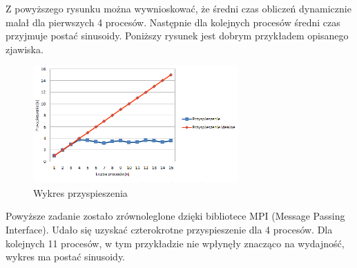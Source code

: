 \documentclass[a4paper,10pt]{article}
\begin{document}
Z powyższego rysunku można wywnioskować, że średni czas obliczeń dynamicznie malał dla pierwszych 4 procesów. Następnie dla kolejnych procesów średni czas przyjmuje postać sinusoidy.
Poniższy rysunek jest dobrym przykładem opisanego zjawiska.

\begin{figure}[ht]
	\centering
  \includegraphics[width=0.7\textwidth]{2.png}
  \caption{Wykres przyspieszenia}
\end{figure}

Powyższe zadanie zostało zrównoleglone dzięki bibliotece MPI (Message Passing Interface). Udało się uzyskać czterokrotne przyspieszenie dla 4 procesów. Dla kolejnych 11 procesów, w tym przykładzie nie wpłynęły znacząco na wydajność, wykres ma postać sinusoidy.
\end{document}
